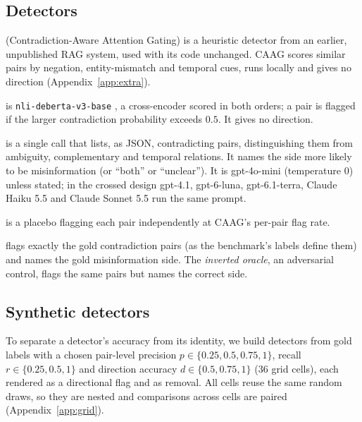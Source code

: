 \subsection{Detectors}
\label{sec:detectors}
\begin{description}[leftmargin=0pt,itemsep=1pt,topsep=2pt]
\item[CAAG] (Contradiction-Aware Attention Gating) is a heuristic detector from an earlier, unpublished RAG system,
used with its code unchanged. CAAG scores similar pairs by negation, entity-mismatch and temporal cues, runs locally
and gives no direction (Appendix~\ref{app:extra}).
\item[NLI] is \texttt{nli-deberta-v3-base} \citep{he2023debertav3}, a cross-encoder scored in both orders; a pair is
flagged if the larger contradiction probability exceeds $0.5$. It gives no direction.
\item[LLM] is a single call that lists, as JSON, contradicting pairs, distinguishing them from ambiguity, complementary and
temporal relations. It names the side more likely to be misinformation (or ``both'' or ``unclear''). It is
gpt-4o-mini (temperature 0) unless stated; in the crossed design gpt-4.1, gpt-6-luna, gpt-6.1-terra, Claude Haiku 5.5
and Claude Sonnet 5.5 run the same prompt.
\item[Random] is a placebo flagging each pair independently at CAAG's per-pair flag rate.
\item[Oracle] flags exactly the gold contradiction pairs (as the benchmark's labels define them) and names the gold
misinformation side. The
\emph{inverted oracle}, an adversarial control, flags the same pairs but names the correct side.
\end{description}

\subsection{Synthetic detectors}
\label{sec:synthetic}
To separate a detector's accuracy from its identity, we build detectors from gold labels with a chosen pair-level
precision $p\in\{0.25,0.5,0.75,1\}$, recall $r\in\{0.25,0.5,1\}$ and direction accuracy $d\in\{0.5,0.75,1\}$ (36
grid cells), each rendered as a directional flag and as removal. All cells reuse the same random draws, so they are nested
and comparisons across cells are paired (Appendix~\ref{app:grid}).
